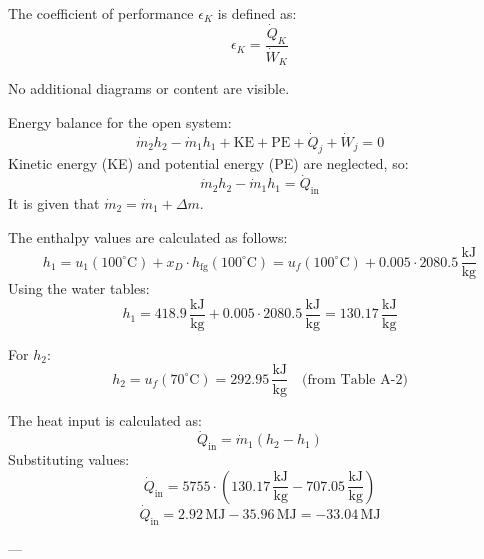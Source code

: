 The coefficient of performance \( \epsilon_K \) is defined as:  
\[
\epsilon_K = \frac{\dot{Q}_K}{\dot{W}_K}
\]  

No additional diagrams or content are visible.

Energy balance for the open system:  
\[
\dot{m}_2 h_2 - \dot{m}_1 h_1 + \text{KE} + \text{PE} + \dot{Q}_j + \dot{W}_j = 0
\]  
Kinetic energy (KE) and potential energy (PE) are neglected, so:  
\[
\dot{m}_2 h_2 - \dot{m}_1 h_1 = \dot{Q}_{\text{in}}
\]  
It is given that \( \dot{m}_2 = \dot{m}_1 + \Delta m \).  

The enthalpy values are calculated as follows:  
\[
h_1 = u_1(100^\circ\text{C}) + x_D \cdot h_{\text{fg}}(100^\circ\text{C}) = u_f(100^\circ\text{C}) + 0.005 \cdot 2080.5 \, \frac{\text{kJ}}{\text{kg}}
\]  
Using the water tables:  
\[
h_1 = 418.9 \, \frac{\text{kJ}}{\text{kg}} + 0.005 \cdot 2080.5 \, \frac{\text{kJ}}{\text{kg}} = 130.17 \, \frac{\text{kJ}}{\text{kg}}
\]  

For \( h_2 \):  
\[
h_2 = u_f(70^\circ\text{C}) = 292.95 \, \frac{\text{kJ}}{\text{kg}} \quad \text{(from Table A-2)}
\]  

The heat input is calculated as:  
\[
\dot{Q}_{\text{in}} = \dot{m}_1 (h_2 - h_1)
\]  
Substituting values:  
\[
\dot{Q}_{\text{in}} = 5755 \cdot (130.17 \, \frac{\text{kJ}}{\text{kg}} - 707.05 \, \frac{\text{kJ}}{\text{kg}})
\]  
\[
\dot{Q}_{\text{in}} = 2.92 \, \text{MJ} - 35.96 \, \text{MJ} = -33.04 \, \text{MJ}
\]  

---